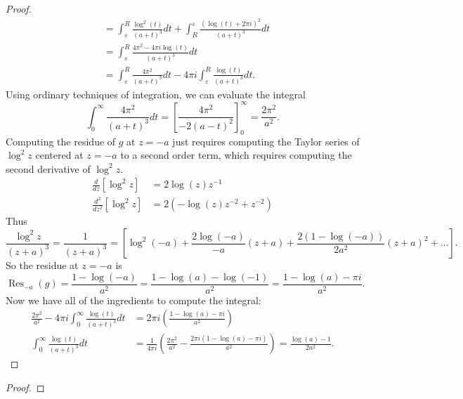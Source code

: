 \documentclass{article}
\newenvironment{problem}[2][Problem]{\begin{trivlist}
\item[\hskip \labelsep {\bfseries #1}\hskip \labelsep {\bfseries #2.}]}{\end{trivlist}}
\begin{document}
\begin{proof}
\begin{align*}
    &=
    \int_\varepsilon^R \frac{\log^2(t)}{(a + t)^3}dt +
    \int_R^\varepsilon \frac{(\log(t) + 2\pi i)^2}{(a + t)^3}dt \\
    &=
    \int_\varepsilon^R \frac{4\pi^2 - 4\pi i\log(t)}{(a + t)^3}dt \\
    &=
    \int_\varepsilon^R \frac{4\pi^2}{(a + t)^3}dt - 4\pi i\int_\varepsilon^R \frac{\log(t)}{(a + t)^3}dt.
  \end{align*}
  Using ordinary techniques of integration, we can evaluate the integral \[
    \int_0^\infty \frac{4\pi^2}{(a + t)^3}dt = \left[\frac{4\pi^2}{-2(a - t)^2}\right]_0^\infty = \frac{2\pi^2}{a^2}.
  \]
  Computing the residue of $g$ at $z = -a$ just requires computing the Taylor
  series of $\log^2z$ centered at $z = -a$ to a second order term, which requires
  computing the second derivative of $\log^2 z$. \begin{align*}
    \frac{d}{dz}[\log^2 z] &= 2\log(z)z^{-1} \\
    \frac{d^2}{dz^2}[\log^2 z] &= 2(-\log(z)z^{-2} + z^{-2})
  \end{align*}
  Thus \[
    \frac{\log^2 z}{(z + a)^3} = \frac{1}{(z + a)^3} = \left[
      \log^2(-a)
      + \frac{2\log(-a)}{-a}(z + a)
      + \frac{2(1 - \log(-a))}{2a^{2}}(z + a)^2
      + \hdots
    \right].
  \]
  So the residue at $z = -a$ is \[
    \operatorname{Res}_{-a}(g)
    = \frac{1 - \log(-a)}{a^{2}}
    = \frac{1 - \log(a) - \log(-1)}{a^{2}}
    = \frac{1 - \log(a) - \pi i}{a^{2}}.
  \]
  Now we have all of the ingredients to compute the integral: \begin{align*}
  \frac{2\pi^2}{a^2} - 4\pi i\int_0^\infty \frac{\log(t)}{(a + t)^3}dt &= 2\pi i \left(\frac{1 - \log(a) - \pi i}{a^{2}}\right) \\
  \int_0^\infty \frac{\log(t)}{(a + t)^3}dt &= \frac{1}{4\pi i}\left(\frac{2\pi^2}{a^2} - \frac{2\pi i(1 - \log(a) - \pi i)}{a^{2}}\right)
  = \frac{\log(a) - 1}{2a^2}.
  \end{align*}
\end{proof}

\pagebreak

\begin{problem}{2}
\end{problem}

\begin{proof}
\end{proof}
\end{document}
